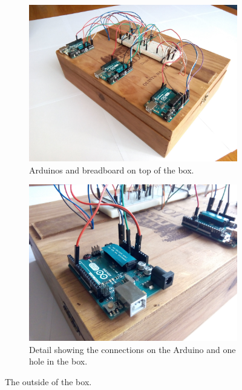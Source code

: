 \begin{figure}[h]
    \centering
    \begin{subfigure}[t]{0.49\textwidth}
        \centering
        \includegraphics[width=\textwidth]{img/setup_box_closed}
        \caption{Arduinos and breadboard on top of the box.}
        \label{fig:setup_box_closed}
    \end{subfigure}
    \begin{subfigure}[t]{0.49\textwidth}
        \centering
        \includegraphics[width=\textwidth]{img/setup_arduino_connections.jpg}
        \caption{Detail showing the connections on the Arduino and one hole in the box.}
        \label{fig:setup_arduino_connections}
    \end{subfigure}
    \caption{The outside of the box.}
    \label{fig:setup_box_outside}
\end{figure}


